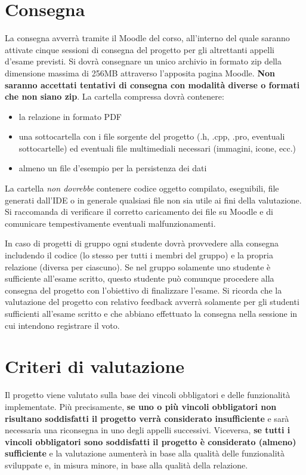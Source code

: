 \documentclass[10pt,a4paper,oneside]{article}
\begin{document}
\section{Consegna}
La consegna avverrà tramite il Moodle del corso, all'interno del quale saranno attivate cinque sessioni di consegna del progetto per gli altrettanti appelli d'esame previsti. Si dovrà consegnare un unico archivio in formato zip della dimensione massima di 256MB attraverso l'apposita pagina Moodle. \textbf{Non saranno accettati tentativi di consegna con modalità diverse o formati che non siano zip}. La cartella compressa dovrà contenere:
\begin{itemize}
 \item la relazione in formato PDF
 \item una sottocartella con i file sorgente del progetto (.h, .cpp, .pro, eventuali sottocartelle) ed eventuali file multimediali necessari (immagini, icone, ecc.)
 \item almeno un file d'esempio per la persistenza dei dati
\end{itemize}
La cartella \emph{non dovrebbe} contenere codice oggetto compilato, eseguibili, file generati dall'IDE o in generale qualsiasi file non sia utile ai fini della valutazione. Si raccomanda di verificare il corretto caricamento dei file su Moodle e di comunicare tempestivamente eventuali malfunzionamenti.

In caso di progetti di gruppo ogni studente dovrà provvedere alla consegna includendo il codice (lo stesso per tutti i membri del gruppo) e la propria relazione (diversa per ciascuno). Se nel gruppo solamente uno studente è sufficiente all'esame scritto, questo studente può comunque procedere alla consegna del progetto con l'obiettivo di finalizzare l'esame. Si ricorda che la valutazione del progetto con relativo feedback avverrà solamente per gli studenti sufficienti all'esame scritto e che abbiano effettuato la consegna nella sessione in cui intendono registrare il voto.


\section{Criteri di valutazione}
Il progetto viene valutato sulla base dei vincoli obbligatori e delle funzionalità implementate. Più precisamente, \textbf{se uno o più vincoli obbligatori non risultano soddisfatti il progetto verrà considerato insufficiente} e sarà necessaria una riconsegna in uno degli appelli successivi. Viceversa, \textbf{se tutti i vincoli obbligatori sono soddisfatti il progetto è considerato (almeno) sufficiente} e la valutazione aumenterà in base alla qualità delle funzionalità sviluppate e, in misura minore, in base alla qualità della relazione.
\end{document}
